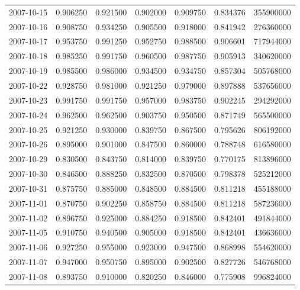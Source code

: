 \begin{tabular}{lrrrrrr}
2007-10-15 &    0.906250 &    0.921500 &    0.902000 &    0.909750 &    0.834376 &   355900000 \\
2007-10-16 &    0.908750 &    0.934250 &    0.905500 &    0.918000 &    0.841942 &   276360000 \\
2007-10-17 &    0.953750 &    0.991250 &    0.952750 &    0.988500 &    0.906601 &   717944000 \\
2007-10-18 &    0.985250 &    0.991750 &    0.960500 &    0.987750 &    0.905913 &   340620000 \\
2007-10-19 &    0.985500 &    0.986000 &    0.934500 &    0.934750 &    0.857304 &   505768000 \\
2007-10-22 &    0.928750 &    0.981000 &    0.921250 &    0.979000 &    0.897888 &   537656000 \\
2007-10-23 &    0.991750 &    0.991750 &    0.957000 &    0.983750 &    0.902245 &   294292000 \\
2007-10-24 &    0.962500 &    0.962500 &    0.903750 &    0.950500 &    0.871749 &   565500000 \\
2007-10-25 &    0.921250 &    0.930000 &    0.839750 &    0.867500 &    0.795626 &   806192000 \\
2007-10-26 &    0.895000 &    0.901000 &    0.847500 &    0.860000 &    0.788748 &   616580000 \\
2007-10-29 &    0.830500 &    0.843750 &    0.814000 &    0.839750 &    0.770175 &   813896000 \\
2007-10-30 &    0.846500 &    0.888250 &    0.832500 &    0.870500 &    0.798378 &   525212000 \\
2007-10-31 &    0.875750 &    0.885000 &    0.848500 &    0.884500 &    0.811218 &   455188000 \\
2007-11-01 &    0.870750 &    0.902250 &    0.858750 &    0.884500 &    0.811218 &   587236000 \\
2007-11-02 &    0.896750 &    0.925000 &    0.884250 &    0.918500 &    0.842401 &   491844000 \\
2007-11-05 &    0.910750 &    0.940500 &    0.905000 &    0.918500 &    0.842401 &   436636000 \\
2007-11-06 &    0.927250 &    0.955000 &    0.923000 &    0.947500 &    0.868998 &   554620000 \\
2007-11-07 &    0.947000 &    0.950750 &    0.895000 &    0.902500 &    0.827726 &   546768000 \\
2007-11-08 &    0.893750 &    0.910000 &    0.820250 &    0.846000 &    0.775908 &   996824000 \\

\end{tabular}
